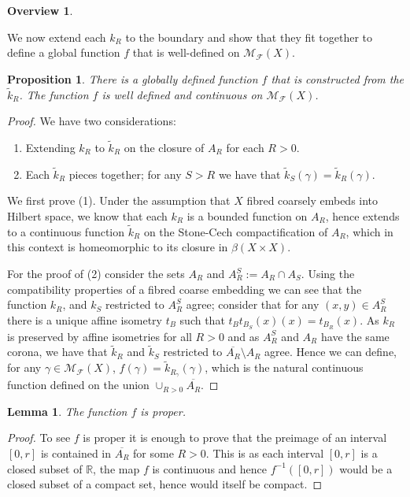\documentclass[11pt]{amsart}
\theoremstyle{plain}
\newtheorem{lemma}[theorem]{Lemma}%
\newtheorem{proposition}[theorem]{Proposition}%
\newtheorem{rem}[theorem]{Overview}
\theoremstyle{definition}%
\theoremstyle{remark}%
\begin{document}
{\begin{rem}
\begin{enumerate}
\end{enumerate}
\end{rem}

We now extend each $k_{R}$ to the boundary and show that they fit together to define a global function $f$ that is well-defined on $\mathcal{M}_{\mathcal{F}}(X)$.

\begin{proposition}\label{prop:wd}
There is a globally defined function $f$ that is constructed from the $\tilde{k}_{R}$. The function $f$ is well defined and continuous on $\mathcal{M}_{\mathcal{F}}(X)$.
\end{proposition}
\begin{proof}
We have two considerations:
\begin{enumerate}
\item Extending $k_{R}$ to $\tilde{k}_{R}$ on the closure of $A_{R}$ for each $R>0$.
\item Each $\tilde{k}_{R}$ pieces together; for any $S>R$ we have that $\tilde{k}_{S}(\gamma)=\tilde{k}_{R}(\gamma)$.
\end{enumerate}
We first prove (1). Under the assumption that $X$ fibred coarsely embeds into Hilbert space, we know that each $k_{R}$ is a bounded function on $A_{R}$, hence extends to a continuous function $\tilde{k}_{R}$ on the Stone-Cech compactification of $A_{R}$, which in this context is homeomorphic to its closure in $\beta(X \times X)$. 

For the proof of (2) consider the sets $A_{R}$ and $A_{R}^{S}:=A_{R}\cap A_{S}$. Using the compatibility properties of a fibred coarse embedding we can see that the function $k_{R}$, and $k_{S}$ restricted to $A_{R}^{S}$ agree; consider that for any $(x,y)\in A_{R}^{S}$ there is a unique affine isometry $t_{B}$ such that $t_{B}t_{B_{S}}(x)(x) = t_{B_{R}}(x)$. As $k_{R}$ is preserved by affine isometries for all $R>0$ and as $A_{R}^{S}$ and $A_{R}$ have the same corona, we have that $\tilde{k}_{R}$ and $\tilde{k}_{S}$ restricted to $\overline{A_{R}}\setminus A_{R}$ agree. Hence we can define, for any $\gamma \in \mathcal{M}_{\mathcal{F}}(X)$, $f(\gamma) = \tilde{k}_{R_{\gamma}}(\gamma)$, which is the natural continuous function defined on the union $\cup_{R>0}\overline{A_{R}}$.
\end{proof}


\begin{lemma}\label{lem:MT1-a}
The function $f$ is proper.
\end{lemma}
\begin{proof}
To see $f$ is proper it is enough to prove that the preimage of an interval $[0,r]$ is contained in $\overline{A_{R}}$ for some $R>0$. This is as each interval $[0,r]$ is a closed subset of $\mathbb{R}$, the map $f$ is continuous and hence $f^{-1}([0,r])$ would be a closed subset of a compact set, hence would itself be compact.


\end{proof}}
\end{document}
